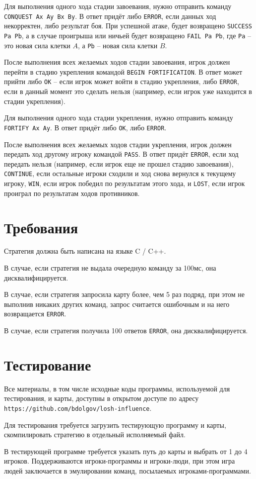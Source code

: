 \documentclass[12pt, a4paper]{article}
\begin{document}
Для выполнения одного хода стадии завоевания, нужно отправить команду \texttt{CONQUEST Ax Ay Bx By}. В ответ придёт либо \texttt{ERROR}, если данных ход некорректен, либо результат боя. При успешной атаке, будет возвращено \texttt{SUCCESS Pa Pb}, а в случае проигрыша или ничьей будет возвращено \texttt{FAIL Pa Pb}, где \texttt{Pa} -- это новая сила клетки $A$, а \texttt{Pb} -- новая сила клетки $B$.

После выполнения всех желаемых ходов стадии завоевания, игрок должен перейти в стадию укрепления командой \texttt{BEGIN FORTIFICATION}. В ответ может прийти либо \texttt{OK} -- если игрок может войти в стадию укрепления, либо \texttt{ERROR}, если в данный момент это сделать нельзя (например, если игрок уже находится в стадии укрепления).

Для выполнения одного хода стадии укрепления, нужно отправить команду \texttt{FORTIFY Ax Ay}. В ответ придёт либо \texttt{OK}, либо \texttt{ERROR}.

После выполнения всех желаемых ходов стадии укрепления, игрок должен передать ход другому игроку командой \texttt{PASS}. В ответ придёт \texttt{ERROR}, если ход передать нельзя (например, если игрок еще не прошел стадию завоевания), \texttt{CONTINUE}, если остальные игроки сходили и ход снова вернулся к текущему игроку, \texttt{WIN}, если игрок победил по результатам этого хода, и \texttt{LOST}, если игрок проиграл по результатам ходов противников.



{\section{Требования}}

Стратегия должна быть написана на языке C / C++.

В случае, если стратегия не выдала очередную команду за 100мс, она дисквалифицируется.

В случае, если стратегия запросила карту более, чем 5 раз подряд, при этом не выполнив никаких других команд, запрос считается ошибочным и на него возвращается \texttt{ERROR}.

В случае, если стратегия получила 100 ответов \texttt{ERROR}, она дисквалифицируется.

{\section{Тестирование}}

Все материалы, в том числе исходные коды программы, используемой для тестирования, и карты, доступны в открытом доступе по адресу
\texttt{https://github.com/bdolgov/losh-influence}.

Для тестирования требуется загрузить тестирующую программу и карты, скомпилировать стратегию в отдельный исполняемый файл.

В тестирующей программе требуется указать путь до карты и выбрать от 1 до 4 игроков. Поддерживаются игроки-программы и игроки-люди, при этом игра людей заключается в эмулировании команд, посылаемых игроками-программами.
\end{document}
